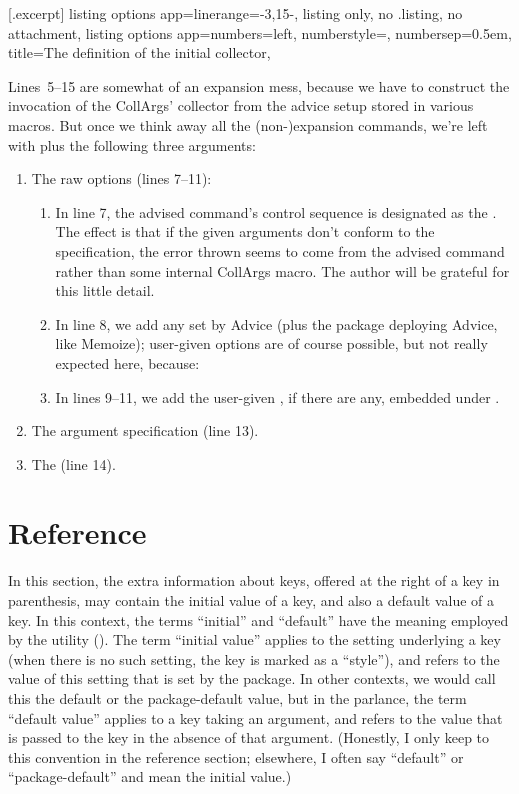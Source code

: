 \documentclass[a4paper,11pt]{article}
\begin{document}
[.excerpt]{%
  listing options app={linerange={-3,15-}},
  listing only, no .listing, no attachment,
  listing options app={numbers=left, numberstyle=\tiny, numbersep=0.5em},
  title={The definition of the initial collector},
}

Lines~5--15 are somewhat of an expansion mess, because we have to construct the
invocation of the CollArgs' collector from the advice setup stored in various
macros.  But once we think away all the (non-)expansion commands, we're left
with  plus the following three arguments:
\begin{enumerate}
\item The raw options (lines 7--11):
  \begin{enumerate}
  \item In line 7, the advised command's control sequence is designated as the
    .  The effect is that if the given arguments don't
    conform to the specification, the error thrown seems to come from the
    advised command rather than some internal CollArgs macro.  The author will
    be grateful for this little detail.
  \item In line 8, we add any  set by Advice
    (plus the package deploying Advice, like Memoize); user-given options are of
    course possible, but not really expected here, because:
  \item In lines 9--11, we add the user-given ,
    if there are any, embedded under .
  \end{enumerate}
\item The argument specification (line 13).
\item The  (line 14).
\end{enumerate}



\section{Reference}
\label{sec:reference}

In this section, the extra information about keys, offered at the right of a
key in parenthesis, may contain the initial value of a key, and also a default
value of a key.  In this context, the terms ``initial'' and ``default'' have
the meaning employed by the  utility ().  The term
``initial value'' applies to the setting underlying a key (when there is no
such setting, the key is marked as a ``style''), and refers to the value of
this setting that is set by the package.  In other contexts, we would call this
the default or the package-default value, but in the  parlance,
the term ``default value'' applies to a key taking an argument, and refers to
the value that is passed to the key in the absence of that argument.
(Honestly, I only keep to this convention in the reference section; elsewhere,
I often say ``default'' or ``package-default'' and mean the initial value.)
\end{document}
